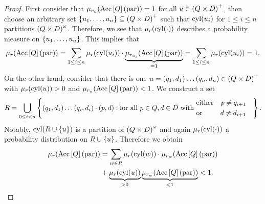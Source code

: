 \begin{proof}
  First consider that $\mu_{r_{u}}(\operatorname{Acc}\left[Q\right](\operatorname{par})) = 1$ for all
  $u\in\left(Q\times D\right)^{+}$, then choose an arbitrary set 
  $\left\{u_{1}, \dots, u_{n}\right\}\subseteq\left(Q\times D\right)^{+}$ such that
  $\operatorname{cyl}(u_{i})$ for $1\leq i\leq n$ partitions $\left(Q\times D\right)^{\omega}$.
  Therefore, we see that $\mu_{r}(\operatorname{cyl}(\cdot))$ describes a probability 
  measure on $\left\{u_{1}, \dots, u_{n}\right\}$. This implies that
  \begin{equation*}
    \mu_{r}(\operatorname{Acc}\left[Q\right](\operatorname{par})) = \sum\limits_{1\leq i\leq n}
      \mu_{r}(\operatorname{cyl}(u_{i}))\cdot\underbrace{\mu_{r_{u_{i}}}(
      \operatorname{Acc}\left[Q\right](\operatorname{par}))}_{=1} = \sum\limits_{1\leq i\leq n}
      \mu_{r}(\operatorname{cyl}(u_{i})) = 1.
  \end{equation*}
  On the other hand, consider that there is one 
  $u = \left(q_{1}, d_{1}\right)\dots\left(q_{n}, d_{n}\right)\in\left(Q\times D\right)^{+}$
  with $\mu_{r}(\operatorname{cyl}(u)) > 0$ and 
  $\mu_{r_{u}}(\operatorname{Acc}\left[Q\right](\operatorname{par})) < 1$. We construct a set 
  \begin{equation*}
    R = \bigcup\limits_{0\leq i < n}\left\{
      \left(q_{1}, d_{1}\right)\dots\left(q_{i}, d_{i}\right)\cdot\left(p, d\right):
        \text{for all }p\in Q,d\in D\text{ with }
      \begin{aligned}
          &\text{either}&p\neq q_{i+1}\\
          &\text{or}&d\neq d_{i+1}&
      \end{aligned}
    \right\}.
  \end{equation*}
  Notably, $\operatorname{cyl}(R\cup\left\{u\right\})$ is a partition of 
  $\left(Q\times D\right)^{\omega}$ and again $\mu_{r}(\operatorname{cyl}(\cdot))$ a probability
  distribution on $R\cup\left\{u\right\}$. Therefore we obtain
  \begin{align*}
    \mu_{r}(\operatorname{Acc}\left[Q\right](\operatorname{par})) &= \sum\limits_{w\in R}
      \mu_{r}(\operatorname{cyl}(w))\cdot\mu_{r_{w}}(\operatorname{Acc}\left[Q\right](\operatorname{par}))\\
    &+ \underbrace{\mu_{r}(\operatorname{cyl}(u))}_{>0}\underbrace{\mu_{r_{w}}(
      \operatorname{Acc}\left[Q\right](\operatorname{par}))}_{<1} < 1.
  \end{align*}
\end{proof}

